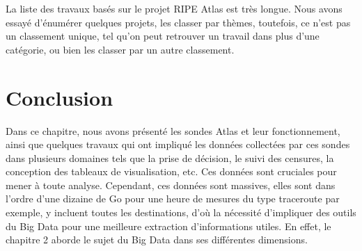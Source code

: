 La liste des travaux basés sur le projet RIPE Atlas est très longue. Nous avons essayé d'énumérer quelques projets, les classer par thèmes, toutefois, ce n'est pas un classement unique, tel qu'on peut retrouver un travail dans plus d'une catégorie, ou bien les classer par un autre classement.

\section{Conclusion}

Dans ce chapitre, nous avons présenté les sondes Atlas et leur fonctionnement, ainsi que quelques travaux qui ont impliqué les données collectées par ces sondes dans plusieurs domaines tels que la prise de décision, le suivi des censures, la conception des tableaux de visualisation, etc. Ces données sont cruciales pour mener à toute analyse. Cependant, ces données sont massives, elles sont  dans l'ordre d'une dizaine de Go pour une heure de mesures du type traceroute par exemple, y incluent toutes les destinations, d'où la nécessité d'impliquer des outils
du Big Data pour une meilleure extraction d'informations utiles. En effet, le chapitre 2 aborde le sujet du Big Data dans ses différentes dimensions. 




